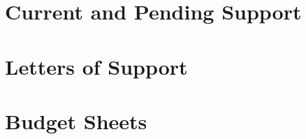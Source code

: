 \documentclass[12pt]{article}
\begin{document}
\section{Current and Pending Support}
\label{sec:current_and_pending}

\newpage
\addtocounter{page}{13}
\section{Letters of Support}
\label{sec:lettersofsupport}

\newpage
\addtocounter{page}{3}



\newpage

\section{Budget Sheets}


\end{document}
